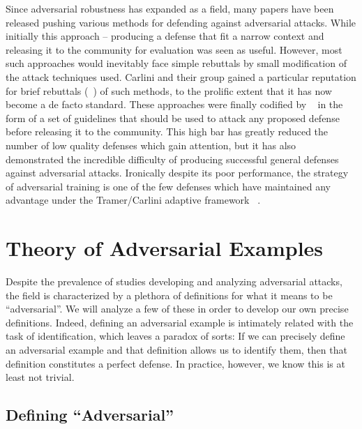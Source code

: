 Since adversarial robustness has expanded as a field, many papers have
been released pushing various methods for defending against
adversarial attacks. While initially this approach -- producing a
defense that fit a narrow context and releasing it to the community
for evaluation was seen as useful. However, most such approaches would
inevitably face simple rebuttals by small modification of the attack
techniques used. Carlini and their group gained a particular
reputation for brief rebuttals (~\cite{carlini_towards_2016, papernot_cleverhans_2016}) of such methods, to the prolific extent
that it has now become a de facto standard. These approaches were
finally codified by ~\cite{tramer2020adaptive} in the form of a set of
guidelines that should be used to attack any proposed defense before
releasing it to the community. This high bar has greatly reduced the
number of low quality defenses which gain attention, but it has also
demonstrated the incredible difficulty of producing successful general
defenses against adversarial attacks. Ironically despite its poor
performance, the strategy of adversarial training is one of the few
defenses which have maintained any advantage under the Tramer/Carlini
adaptive framework ~\cite{tramer2019adversarial}. 


\section{Theory of Adversarial Examples}

Despite the prevalence of studies developing and analyzing adversarial
attacks, the field is characterized by a plethora of definitions for
what it means to be ``adversarial''. We will analyze a few of these in
order to develop our own precise definitions. Indeed, defining an
adversarial example is intimately related with the task of
identification, which leaves a paradox of sorts: If we can precisely
define an adversarial example and that definition allows us to
identify them, then that definition constitutes a perfect defense. In
practice, however, we know this is at least not trivial. 

\subsection{Defining ``Adversarial''}

